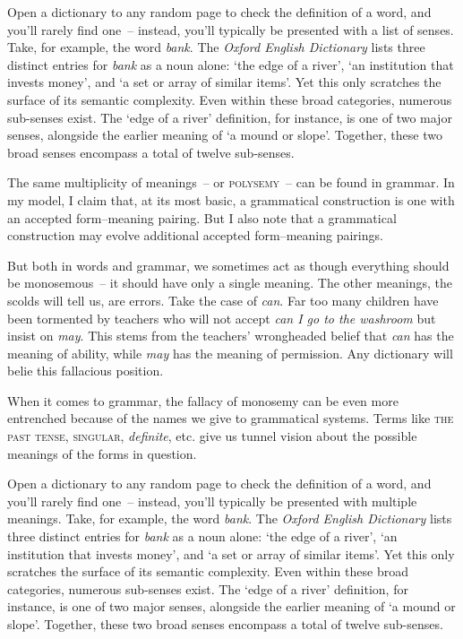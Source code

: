 Open a dictionary to any random page to check the definition of a word, and you'll rarely find one~-- instead, you'll typically be presented with a list of senses. Take, for example, the word \textit{bank}. The \textit{Oxford English Dictionary} lists three distinct entries for \textit{bank} as a noun alone: `the edge of a river', `an institution that invests money', and `a set or array of similar items'. Yet this only scratches the surface of its semantic complexity. Even within these broad categories, numerous sub-senses exist. The `edge of a river' definition, for instance, is one of two major senses, alongside the earlier meaning of `a mound or slope'. Together, these two broad senses encompass a total of twelve sub-senses. 

The same multiplicity of meanings~-- or \textsc{polysemy}~-- can be found in grammar. In my model, I claim that, at its most basic, a grammatical construction is one with an accepted form–meaning pairing. But I also note that a grammatical construction may evolve additional accepted form–meaning pairings.

But both in words and grammar, we sometimes act as though everything should be monosemous~-- it should have only a single meaning. The other meanings, the scolds will tell us, are errors. Take the case of \textit{can}. Far too many children have been tormented by teachers who will not accept \textit{can I go to the washroom} but insist on \textit{may}. This stems from the teachers' wrongheaded belief that \textit{can} has the meaning of ability, while \textit{may} has the meaning of permission. Any dictionary will belie this fallacious position.

When it comes to grammar, the fallacy of monosemy can be even more entrenched because of the names we give to grammatical systems. Terms like \textsc{the past tense}, \textsc{singular}, \textit{definite}, etc. give us tunnel vision about the possible meanings of the forms in question.

Open a dictionary to any random page to check the definition of a word, and you'll rarely find one~-- instead, you'll typically be presented with multiple meanings. Take, for example, the word \textit{bank}. The \textit{Oxford English Dictionary} lists three distinct entries for \textit{bank} as a noun alone: `the edge of a river', `an institution that invests money', and `a set or array of similar items'. Yet this only scratches the surface of its semantic complexity. Even within these broad categories, numerous sub-senses exist. The `edge of a river' definition, for instance, is one of two major senses, alongside the earlier meaning of `a mound or slope'. Together, these two broad senses encompass a total of twelve sub-senses. 

